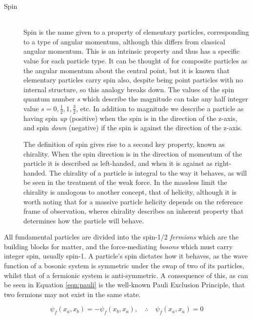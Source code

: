 \begin{description}
\item[Spin] \hfill \\
Spin is the name given to a property of elementary particles, corresponding to a type of angular momentum, although this differs from classical angular momentum. This is an intrinsic property and thus has a specific value for each particle type. It can be thought of for composite particles as the angular momentum about the central point, but it is known that elementary particles carry spin also, despite being point particles with no internal structure, so this analogy breaks down. The values of the spin quantum number $s$ which describe the magnitude can take any half integer value $s=0, \frac{1}{2}, 1, \frac{3}{2}$, etc. In addition to magnitude we describe a particle as having spin \textit{up} (positive) when the spin is in the direction of the z-axis, and spin \textit{down} (negative) if the spin is against the direction of the z-axis. 

The definition of spin gives rise to a second key property, known as chirality. When the spin direction is in the direction of momentum of the particle it is described as left-handed, and when it is against as right-handed. The chirality of a particle is integral to the way it behaves, as will be seen in the treatment of the weak force. In the massless limit  the chirality is analogous to another concept, that of helicity, although it is worth noting that for a massive particle helicity depends on the reference frame of observation, wheres chirality describes an inherent property that determines how the particle will behave.
\end{description}
All fundamental particles are divided into the spin-1/2 \textit{fermions} which are the building blocks for matter, and the force-mediating \textit{bosons} which must carry integer spin, usually spin-1.  A particle's spin dictates how it behaves, as the wave function of a bosonic system is symmetric under the swap of two of its particles, whilst that of a fermionic system is anti-symmetric. A consequence of this, as can be seen in Equation \ref{eqn:pauli} is the well-known Pauli Exclusion Principle, that two fermions may not exist in the same state. 

\begin{equation}
\psi_{f}(x_{a},x_{b}) = -\psi_{f}(x_{b},x_{a}), \quad \therefore \quad \psi_{f}(x_{a},x_{a}) = 0
\label{eqn:pauli}
\end{equation}
 
